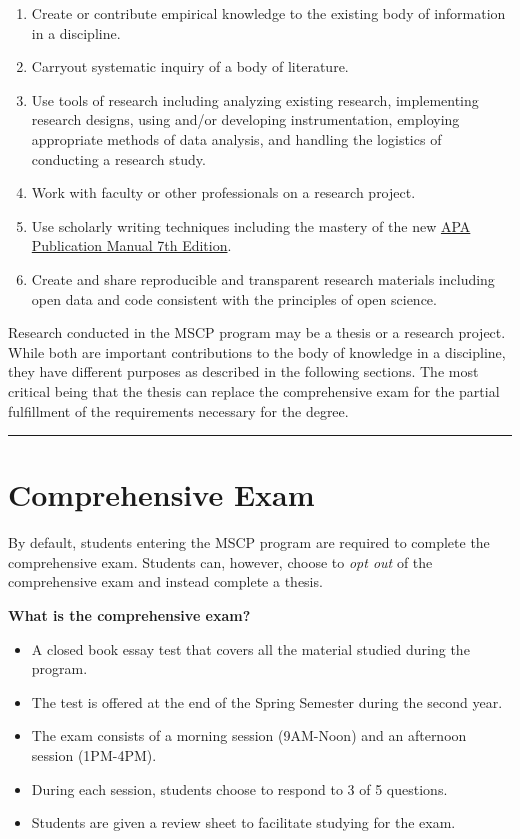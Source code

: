 \documentclass[
  openany]{book}
\providecommand{\tightlist}{%
  \setlength{\itemsep}{0pt}\setlength{\parskip}{0pt}}
\begin{document}
\begin{enumerate}
\def\labelenumi{\arabic{enumi}.}
\tightlist
\item
  Create or contribute empirical knowledge to the existing body of information in a discipline.
\item
  Carryout systematic inquiry of a body of literature.
\item
  Use tools of research including analyzing existing research, implementing research designs, using and/or developing instrumentation, employing appropriate methods of data analysis, and handling the logistics of conducting a research study.
\item
  Work with faculty or other professionals on a research project.
\item
  Use scholarly writing techniques including the mastery of the new \href{https://apastyle.apa.org/products/publication-manual-7th-edition/}{APA Publication Manual 7th Edition}.
\item
  Create and share reproducible and transparent research materials including open data and code consistent with the principles of open science.
\end{enumerate}

Research conducted in the MSCP program may be a thesis or a research project. While both are important contributions to the body of knowledge in a discipline, they have different purposes as described in the following sections. The most critical being that the thesis can replace the comprehensive exam for the partial fulfillment of the requirements necessary for the degree.

\begin{center}\rule{0.5\linewidth}{0.5pt}\end{center}

\hypertarget{comprehensive-exam}{%
\section{Comprehensive Exam}\label{comprehensive-exam}}

By default, students entering the MSCP program are required to complete the comprehensive exam. Students can, however, choose to \emph{opt out} of the comprehensive exam and instead complete a thesis.

\textbf{What is the comprehensive exam?}

\begin{itemize}
\tightlist
\item
  A closed book essay test that covers all the material studied during the program.\\
\item
  The test is offered at the end of the Spring Semester during the second year.
\item
  The exam consists of a morning session (9AM-Noon) and an afternoon session (1PM-4PM).
\item
  During each session, students choose to respond to 3 of 5 questions.
\item
  Students are given a review sheet to facilitate studying for the exam.
\end{itemize}
\end{document}
